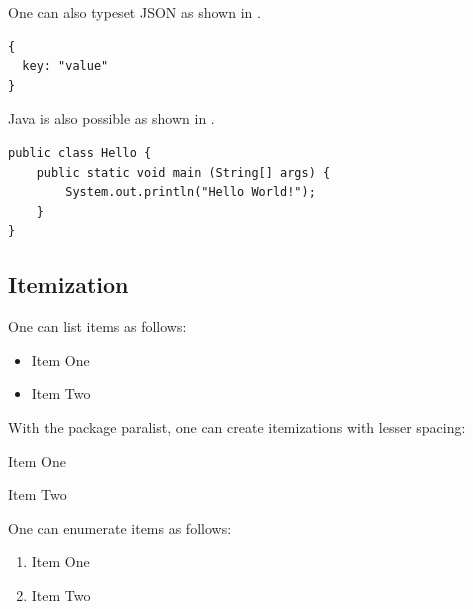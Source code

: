 One can also typeset JSON as shown in .

\begin{ltgexample}
\begin{listing}[htbp]
  \begin{verbatim}
{
  key: "value"
}
\end{verbatim}
  \caption{Example JSON listing using minted}
  \label{lst:flJSON}
\end{listing}
\end{ltgexample}

Java is also possible as shown in .

\begin{ltgexample}
\begin{listing}[htbp]
  \begin{verbatim}
public class Hello {
    public static void main (String[] args) {
        System.out.println("Hello World!");
    }
}
\end{verbatim}
  \caption{Java code rendered using minted}
  \label{lst:flJava}
\end{listing}
\end{ltgexample}

\subsection{Itemization}

One can list items as follows:

\begin{ltgexample}
\begin{itemize}
  \item Item One
  \item Item Two
\end{itemize}
\end{ltgexample}

With the package paralist, one can create itemizations with lesser spacing:

\begin{ltgexample}
\begin{compactitem}
  \item Item One
  \item Item Two
\end{compactitem}
\end{ltgexample}

One can enumerate items as follows:

\begin{ltgexample}
\begin{enumerate}
  \item Item One
  \item Item Two
\end{enumerate}
\end{ltgexample}

